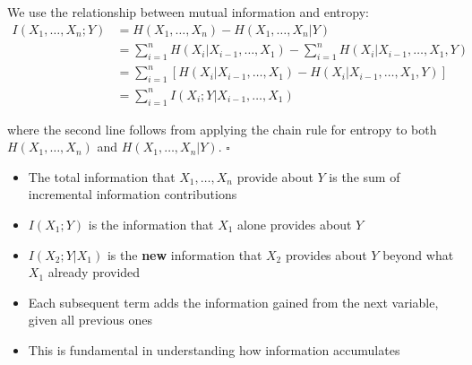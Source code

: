 \documentclass[11pt,a4paper]{book}
\newenvironment{infobox}[1][For more understanding]{
    \begin{tcolorbox}[
        enhanced,
        breakable,
        colback=mintgreen!10,
        colframe=mintgreen!200,
        title=#1,
        fonttitle=\bfseries,
        sharp corners,
        boxrule=0.8pt,
        left=8pt,
        right=8pt,
        top=6pt,
        bottom=6pt
    ]
}{
    \end{tcolorbox}
}
\newenvironment{derivationbox}[1][Derivation]{
    \begin{tcolorbox}[
        enhanced,
        breakable,
        colback=softpeach!10,
        colframe=softpeach!200,
        title=#1,
        fonttitle=\bfseries,
        sharp corners,
        boxrule=0.8pt,
        left=10pt,
        right=10pt,
        top=8pt,
        bottom=8pt
    ]
}{
    \end{tcolorbox}
}
\begin{document}
\begin{derivationbox}[Proof of Chain Rule for Mutual Information]
    We use the relationship between mutual information and entropy:
    \begin{align*}
    I(X_1, \ldots, X_n; Y) &= H(X_1, \ldots, X_n) - H(X_1, \ldots, X_n | Y) \\
    &= \sum_{i=1}^{n} H(X_i | X_{i-1}, \ldots, X_1) - \sum_{i=1}^{n} H(X_i | X_{i-1}, \ldots, X_1, Y) \\
    &= \sum_{i=1}^{n} \left[ H(X_i | X_{i-1}, \ldots, X_1) - H(X_i | X_{i-1}, \ldots, X_1, Y) \right] \\
    &= \sum_{i=1}^{n} I(X_i; Y | X_{i-1}, \ldots, X_1)
    \end{align*}
    
    where the second line follows from applying the chain rule for entropy to both \(H(X_1, \ldots, X_n)\) and \(H(X_1, \ldots, X_n | Y)\). \(\square\)
\end{derivationbox}

\begin{infobox}[Interpretation]
    \begin{itemize}
        \item The total information that \(X_1, \ldots, X_n\) provide about \(Y\) is the sum of incremental information contributions
        \item \(I(X_1; Y)\) is the information that \(X_1\) alone provides about \(Y\)
        \item \(I(X_2; Y | X_1)\) is the \textbf{new} information that \(X_2\) provides about \(Y\) beyond what \(X_1\) already provided
        \item Each subsequent term adds the information gained from the next variable, given all previous ones
        \item This is fundamental in understanding how information accumulates
    \end{itemize}
\end{infobox}
\end{document}
